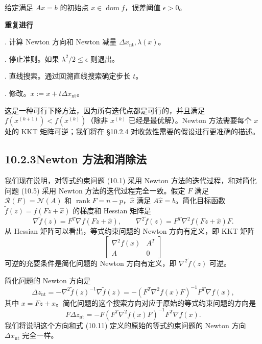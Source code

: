 \documentclass[UTF8, 12pt, fontset=fandol, oneside]{ctexart}
\begin{document}
给定满足 $Ax=b$ 的初始点 $x\in\operatorname{dom} f$，误差阈值 $\epsilon>0$。

\noindent\textbf{重复进行}

. 计算 Newton 方向和 Newton 减量 $\Delta x_{\mathrm{nt}},\lambda(x)$。

. 停止准则。如果 $\lambda^2/2\leq \epsilon$ 则退出。

. 直线搜索。通过回溯直线搜索确定步长 $t$。

. 修改。$x:=x+t\Delta x_{\mathrm{nt}}$。

这是一种可行下降方法，因为所有迭代点都是可行的，并且满足 $f(x^{(k+1)})<f(x^{(k)})$（除非 $x^{(k)}$ 已经是最优解）。Newton 方法需要每个 $x$ 处的 KKT 矩阵可逆；我们将在 \S10.2.4 对收敛性需要的假设进行更准确的描述。

\subsection*{10.2.3\quad Newton 方法和消除法}

我们现在说明，对等式约束问题 (10.1) 采用 Newton 方法的迭代过程，和对简化问题 (10.5) 采用 Newton 方法的迭代过程完全一致。假定 $F$ 满足 $\mathcal{R}(F)=\mathcal{N}(A)$ 和 $\operatorname{rank}F=n-p$，$\hat{x}$ 满足 $A\hat{x}=b$。简化目标函数 $\tilde{f}(z)=f(Fz+\hat{x})$ 的梯度和 Hessian 矩阵是
\[
\nabla\tilde{f}(z)=F^T\nabla f(Fz+\hat{x}),\qquad
\nabla^2\tilde{f}(z)=F^T\nabla^2 f(Fz+\hat{x})F.
\]
从 Hessian 矩阵可以看出，等式约束问题的 Newton 方向有定义，即 KKT 矩阵
\[
\begin{bmatrix}
\nabla^2 f(x) & A^T\\
A & 0
\end{bmatrix}
\]
可逆的充要条件是简化问题的 Newton 方向有定义，即 $\nabla^2\tilde{f}(z)$ 可逆。

简化问题的 Newton 方向是
\begin{equation}
\Delta z_{\mathrm{nt}}
=-\nabla^2\tilde{f}(z)^{-1}\nabla\tilde{f}(z)
=-(F^T\nabla^2 f(x)F)^{-1}F^T\nabla f(x),
\tag{10.15}
\end{equation}
其中 $x=Fz+\hat{x}$。简化问题的这个搜索方向对应于原始的等式约束问题的方向是
\[
F\Delta z_{\mathrm{nt}}=-F(F^T\nabla^2 f(x)F)^{-1}F^T\nabla f(x).
\]
我们将说明这个方向和式 (10.11) 定义的原始的等式约束问题的 Newton 方向 $\Delta x_{\mathrm{nt}}$ 完全一样。
\end{document}
